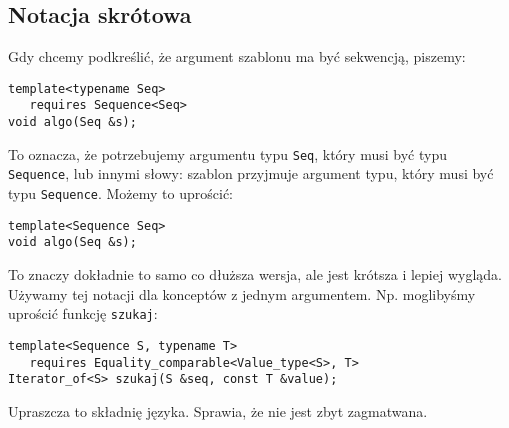 \documentclass[11pt, a4paper]{article}
\begin{document}
\lstset{language=C++}

\subsection{Notacja skrótowa}
Gdy chcemy podkreślić, że argument szablonu ma być sekwencją, piszemy:

\begin{lstlisting}[frame=single]
template<typename Seq>
   requires Sequence<Seq>
void algo(Seq &s);

\end{lstlisting}

To oznacza, że potrzebujemy argumentu typu \verb#Seq#, który musi być typu \verb#Sequence#, lub innymi słowy: szablon przyjmuje argument typu, który musi być typu \verb#Sequence#. Możemy to uprościć:

\begin{lstlisting}[frame=single]
template<Sequence Seq>
void algo(Seq &s);

\end{lstlisting}

To znaczy dokładnie to samo co dłuższa wersja, ale jest krótsza i lepiej wygląda. Używamy tej notacji dla konceptów z jednym argumentem. Np. moglibyśmy uprościć funkcję \verb#szukaj#: \newline

\begin{lstlisting}[frame=single]
template<Sequence S, typename T>
   requires Equality_comparable<Value_type<S>, T>
Iterator_of<S> szukaj(S &seq, const T &value);
\end{lstlisting}

Upraszcza to składnię języka. Sprawia, że nie jest zbyt zagmatwana.
\end{document}
